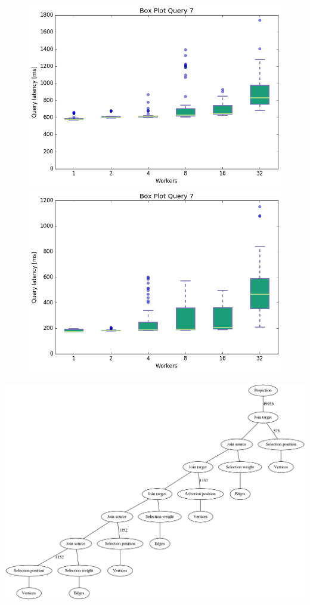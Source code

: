 \documentclass[11pt,singlecolumn]{scrartcl}
\begin{document}
\begin{figure}[!tbp]
  \centering
  \RawFloats
  \begin{minipage}[b]{0.5\textwidth}
    \includegraphics[width=\textwidth]{boxesjl/q7}
  \end{minipage}
  \hfill
  \begin{minipage}[b]{0.5\textwidth}
    \includegraphics[width=\textwidth]{boxesjs/q7}
  \end{minipage}
\end{figure}
\clearpage
\includegraphics[width=1\textwidth]{graph7}
\end{document}
